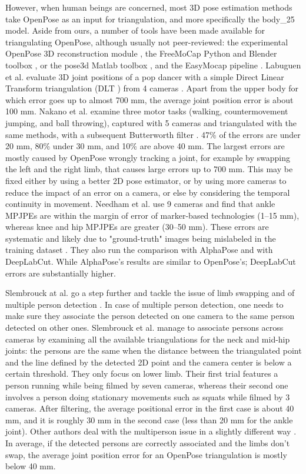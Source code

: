 However, when human beings are concerned, most 3D pose estimation methods take OpenPose as an input for triangulation, and more specifically the body\_25 model. Aside from ours, a number of tools have been made available for triangulating OpenPose, although usually not peer-reviewed: the experimental OpenPose 3D reconstruction module \cite{Hidalgo2021}, the FreeMoCap Python and Blender toolbox \cite{Matthis2022}, or the pose3d Matlab toolbox \cite{Sheshadri2020}, and the EasyMocap pipeline \cite{Easymocap2021}. Labuguen et al. evaluate 3D joint positions of a pop dancer with a simple Direct Linear Transform triangulation (DLT \cite{Hartley1997,Miller1980}) from 4 cameras \cite{Labuguen2020}. Apart from the upper body for which error goes up to almost 700 mm, the average joint position error is about 100 mm. Nakano et al. examine three motor tasks (walking, countermovement jumping, and ball throwing), captured with 5 cameras and triangulated with the same methods, with a subsequent Butterworth filter \cite{Nakano2019}. 47\% of the errors are under 20 mm, 80\% under 30 mm, and 10\% are above 40 mm. The largest errors are mostly caused by OpenPose wrongly tracking a joint, for example by swapping the left and the right limb, that causes large errors up to 700 mm. This may be fixed either by using a better 2D pose estimator, or by using more cameras to reduce the impact of an error on a camera, or else by considering the temporal continuity in movement. Needham et al. use 9 cameras and find that ankle MPJPEs are within the margin of error of marker-based technologies (1–15 mm), whereas knee and hip MPJPEs are greater (30–50 mm). These errors are systematic and likely due to "ground-truth" images being mislabeled in the training dataset \cite{Needham2021b}. They also run the comparison with AlphaPose and with DeepLabCut. While AlphaPose's results are similar to OpenPose’s; DeepLabCut errors are substantially higher.

Slembrouck at al. go a step further and tackle the issue of limb swapping and of multiple person detection \cite{Slembrouck2020}. In case of multiple person detection, one needs to make sure they associate the person detected on one camera to the same person detected on other ones. Slembrouck et al. manage to associate persons across cameras by examining all the available triangulations for the neck and mid-hip joints: the persons are the same when the distance between the triangulated point and the line defined by the detected 2D point and the camera center is below a certain threshold. They only focus on lower limb. Their first trial features a person running while being filmed by seven cameras, whereas their second one involves a person doing stationary movements such as squats while filmed by 3 cameras. After filtering, the average positional error in the first case is about 40 mm, and it is roughly 30 mm in the second case (less than 20 mm for the ankle joint). Other authors deal with the multiperson issue in a slightly different way \cite{Bridgeman2019,Chu2021,Dong2019}. In average, if the detected persons are correctly associated and the limbs don’t swap, the average joint position error for an OpenPose triangulation is mostly below 40 mm.

